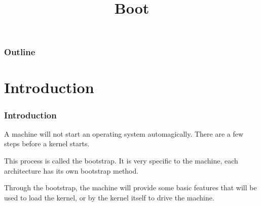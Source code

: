 %
%
%
%
%
%

%
%

%
%

\def\path{../../../..}

%
%



%
%

\title{Boot}

%
%



%
%

\begin{frame}
  \titlepage
\end{frame}

%
%

\begin{frame}
  \frametitle{Outline}

  \tableofcontents
\end{frame}

%
%

%
%

\section{Introduction}

\begin{frame}
  \frametitle{Introduction}

  A machine will not start an operating system automagically. There are a few steps before a kernel starts.

  \-

  This process is called the bootstrap. It is very specific to the machine, each architecture has its own bootstrap method.

  \-

  Through the bootstrap, the machine will provide some basic features that will be used to load the kernel, or by the kernel itself to drive the machine.

\end{frame}

